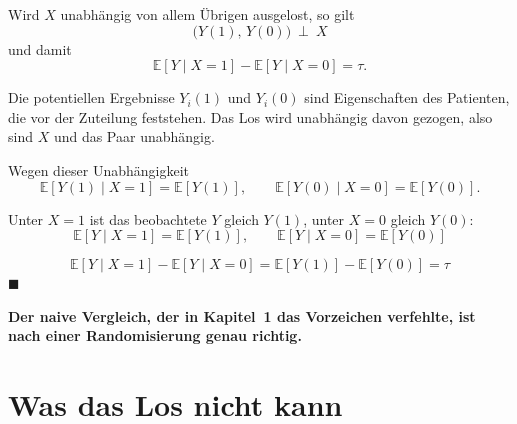 \begin{merksatz}
Wird $X$ unabhängig von allem Übrigen ausgelost, so gilt
\[ \bigl(Y(1),\,Y(0)\bigr) \ \perp\ X \]
und damit
\[ \mathbb{E}[Y \mid X=1] - \mathbb{E}[Y \mid X=0] = \tau . \]

 Die potentiellen Ergebnisse $Y_i(1)$ und $Y_i(0)$ sind Eigenschaften des Patienten, die vor der Zuteilung feststehen. Das Los wird unabhängig davon gezogen, also sind $X$ und das Paar unabhängig.

 Wegen dieser Unabhängigkeit
\[ \mathbb{E}[Y(1) \mid X=1] = \mathbb{E}[Y(1)] , \qquad \mathbb{E}[Y(0) \mid X=0] = \mathbb{E}[Y(0)] . \]

 Unter $X=1$ ist das beobachtete $Y$ gleich $Y(1)$, unter $X=0$ gleich $Y(0)$:
\[ \mathbb{E}[Y \mid X=1] = \mathbb{E}[Y(1)], \qquad \mathbb{E}[Y \mid X=0] = \mathbb{E}[Y(0)] \]

\[ \mathbb{E}[Y \mid X=1] - \mathbb{E}[Y \mid X=0] = \mathbb{E}[Y(1)] - \mathbb{E}[Y(0)] = \tau \]
$\blacksquare$

\begin{center}
\begin{minipage}{0.9\textwidth}
\textbf{Der naive Vergleich, der in Kapitel~1 das Vorzeichen verfehlte, ist nach einer Randomisierung genau richtig.}
\end{minipage}
\end{center}

\begin{center}
\begin{minipage}{0.88\textwidth}
\end{minipage}
\end{center}
\end{merksatz}

\section{Was das Los nicht kann}

